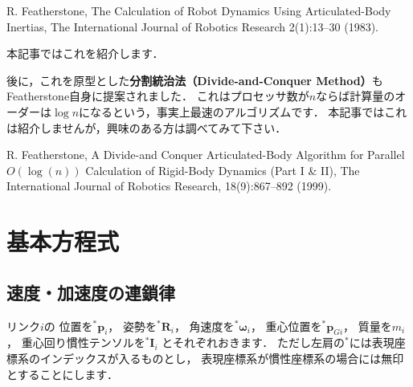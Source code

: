 ﻿\documentclass[a4paper]{jsarticle}
\begin{document}
R. Featherstone, The Calculation of Robot Dynamics Using Articulated-Body Inertias, The International Journal of Robotics Research 2(1):13--30 (1983).

本記事ではこれを紹介します．

後に，これを原型とした{\bf 分割統治法（Divide-and-Conquer Method）}もFeatherstone自身に提案されました．
これはプロセッサ数が$n$ならば計算量のオーダーは$\log n$になるという，事実上最速のアルゴリズムです．
本記事ではこれは紹介しませんが，興味のある方は調べてみて下さい．

R. Featherstone, A Divide-and Conquer Articulated-Body Algorithm for Parallel {$O(\log(n))$} Calculation of Rigid-Body Dynamics (Part I {\&} II), The International Journal of Robotics Research, 18(9):867--892 (1999).





\section{基本方程式}

\subsection{速度・加速度の連鎖律}

リンク$i$の
位置を${}^{*}\bm{p}_{i}$，
姿勢を${}^{*}\bm{R}_{i}$，
角速度を${}^{*}\bm{\omega}_{i}$，
重心位置を${}^{*}\bm{p}_{Gi}$，
質量を$m_{i}$，
重心回り慣性テンソルを${}^{*}\bm{I}_{i}$
とそれぞれおきます．
ただし左肩の${}^{*}$には表現座標系のインデックスが入るものとし，
表現座標系が慣性座標系の場合には無印とすることにします．
\end{document}
